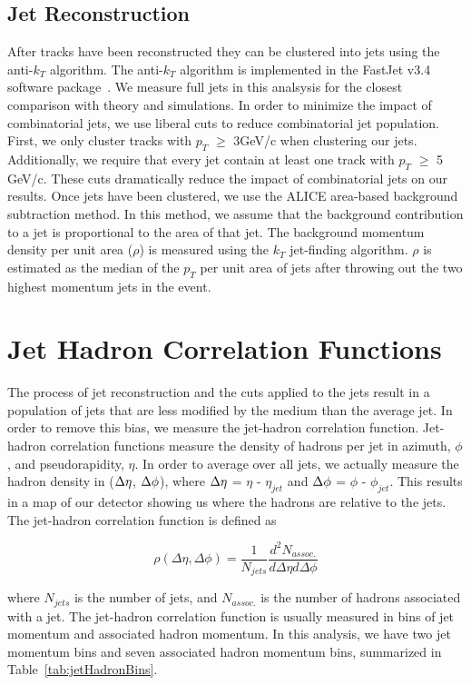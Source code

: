 \subsection*{Jet Reconstruction}
After tracks have been reconstructed they can be clustered into jets using the anti-$k_T$ algorithm. The anti-$k_T$ algorithm is implemented in the FastJet v3.4 software package~\cite{FastJet}. We measure full jets in this analsysis for the closest comparison with theory and simulations. In order to minimize the impact of combinatorial jets, we use liberal cuts to reduce combinatorial jet population. First, we only cluster tracks with $p_T$ $\geq$ 3GeV/c when clustering our jets. Additionally, we require that every jet contain at least one track with $p_T$ $\geq$ 5 GeV/c. These cuts dramatically reduce the impact of combinatorial jets on our results. Once jets have been clustered, we use the ALICE area-based background subtraction method. In this method, we assume that the background contribution to a jet is proportional to the area of that jet. The background momentum density per unit area ($\rho$) is measured using the $k_T$ jet-finding algorithm. $\rho$ is estimated as the median of the $p_T$ per unit area of jets after throwing out the two highest momentum jets in the event.

\section{Jet Hadron Correlation Functions}
 The process of jet reconstruction and the cuts applied to the jets result in a population of jets that are less modified by the medium than the average jet. In order to remove this bias, we measure the jet-hadron correlation function. Jet-hadron correlation functions measure the density of hadrons per jet in azimuth, $\phi$, and pseudorapidity, $\eta$. In order to average over all jets, we actually measure the hadron density in ($\Delta \eta$, $\Delta \phi$), where $\Delta \eta$ = $\eta$ - $\eta_{jet}$ and $\Delta \phi$ = $\phi$ - $\phi_{jet}$. This results in a map of our detector showing us where the hadrons are relative to the jets. The jet-hadron correlation function is defined as 

\begin{equation}
    \rho(\Delta \eta, \Delta \phi) = \frac{1}{N_{jets}} \frac{d^2N_{assoc.}}{d\Delta \eta d\Delta \phi}
\end{equation}

\noindent where $N_{jets}$ is the number of jets, and $N_{assoc.}$ is the number of hadrons associated with a jet. The jet-hadron correlation function is usually measured in bins of jet momentum and associated hadron momentum. In this analysis, we have two jet momentum bins and seven associated hadron momentum bins, summarized in Table~\ref{tab:jetHadronBins}. 

